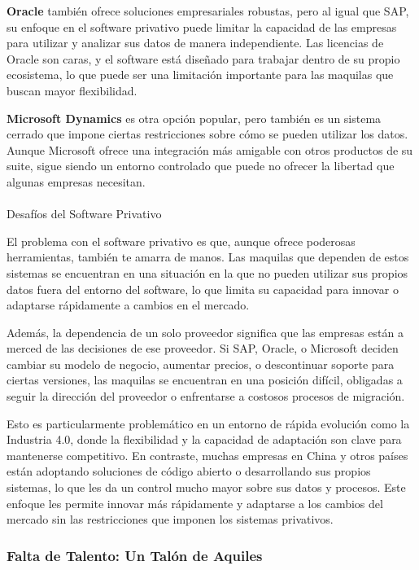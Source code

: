 \documentclass[
  10pt,
  letterpaper,
]{book}
\makeatletter
\let\oldparagraph\paragraph
\renewcommand{\paragraph}{
    \@ifstar
      \xxxParagraphStar
      \xxxParagraphNoStar
  }
\newcommand{\xxxParagraphStar}[1]{\oldparagraph*{#1}\mbox{}}
\newcommand{\xxxParagraphNoStar}[1]{\oldparagraph{#1}\mbox{}}
\makeatother
\begin{document}
\textbf{Oracle} también ofrece soluciones empresariales robustas, pero
al igual que SAP, su enfoque en el software privativo puede limitar la
capacidad de las empresas para utilizar y analizar sus datos de manera
independiente. Las licencias de Oracle son caras, y el software está
diseñado para trabajar dentro de su propio ecosistema, lo que puede ser
una limitación importante para las maquilas que buscan mayor
flexibilidad.

\textbf{Microsoft Dynamics} es otra opción popular, pero también es un
sistema cerrado que impone ciertas restricciones sobre cómo se pueden
utilizar los datos. Aunque Microsoft ofrece una integración más amigable
con otros productos de su suite, sigue siendo un entorno controlado que
puede no ofrecer la libertad que algunas empresas necesitan.

\paragraph{Desafíos del Software
Privativo}\label{desafuxedos-del-software-privativo}

El problema con el software privativo es que, aunque ofrece poderosas
herramientas, también te amarra de manos. Las maquilas que dependen de
estos sistemas se encuentran en una situación en la que no pueden
utilizar sus propios datos fuera del entorno del software, lo que limita
su capacidad para innovar o adaptarse rápidamente a cambios en el
mercado.

Además, la dependencia de un solo proveedor significa que las empresas
están a merced de las decisiones de ese proveedor. Si SAP, Oracle, o
Microsoft deciden cambiar su modelo de negocio, aumentar precios, o
descontinuar soporte para ciertas versiones, las maquilas se encuentran
en una posición difícil, obligadas a seguir la dirección del proveedor o
enfrentarse a costosos procesos de migración.

Esto es particularmente problemático en un entorno de rápida evolución
como la Industria 4.0, donde la flexibilidad y la capacidad de
adaptación son clave para mantenerse competitivo. En contraste, muchas
empresas en China y otros países están adoptando soluciones de código
abierto o desarrollando sus propios sistemas, lo que les da un control
mucho mayor sobre sus datos y procesos. Este enfoque les permite innovar
más rápidamente y adaptarse a los cambios del mercado sin las
restricciones que imponen los sistemas privativos.

\subsubsection{Falta de Talento: Un Talón de
Aquiles}\label{falta-de-talento-un-taluxf3n-de-aquiles}
\end{document}
